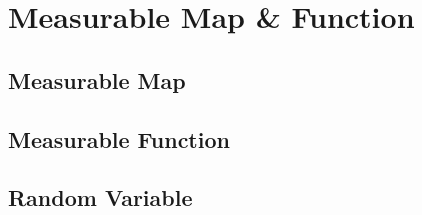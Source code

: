 \chapter{Measurable Map \& Function}

\section{Measurable Map}

\section{Measurable Function}

\section{Random Variable}





